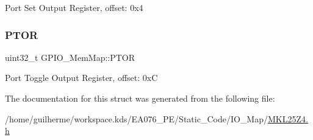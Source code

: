 Port Set Output Register, offset\+: 0x4 \mbox{\label{struct_g_p_i_o___mem_map_a03faa882b5f4554ff4c11954c2d8759b}} 
\subsubsection{\texorpdfstring{P\+T\+OR}{PTOR}}
{\footnotesize\ttfamily uint32\+\_\+t G\+P\+I\+O\+\_\+\+Mem\+Map\+::\+P\+T\+OR}

Port Toggle Output Register, offset\+: 0xC 

The documentation for this struct was generated from the following file\+:\begin{DoxyCompactItemize}
\item 
/home/guilherme/workspace.\+kds/\+E\+A076\+\_\+\+P\+E/\+Static\+\_\+\+Code/\+I\+O\+\_\+\+Map/\hyperlink{_m_k_l25_z4_8h}{M\+K\+L25\+Z4.\+h}\end{DoxyCompactItemize}

